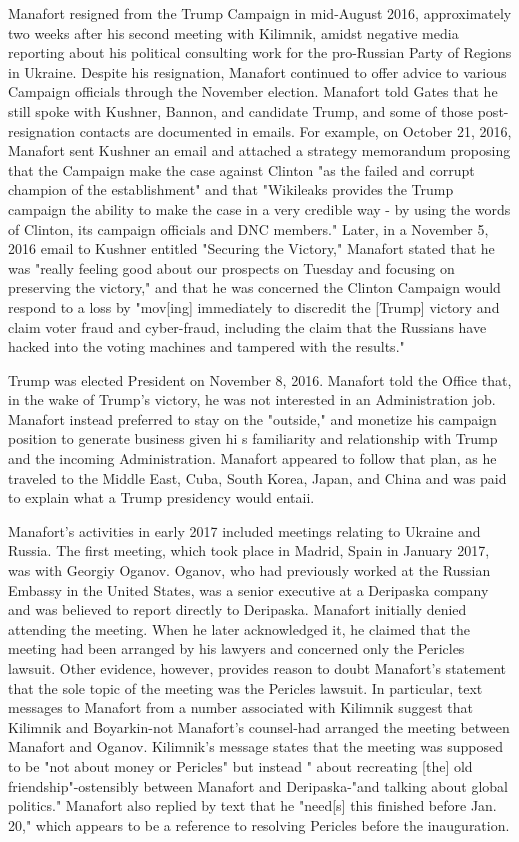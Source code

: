 Manafort resigned from the Trump Campaign in mid-August 2016, approximately two weeks after his second meeting with Kilimnik, amidst negative media reporting about his political consulting work for the pro-Russian Party of Regions in Ukraine. Despite his resignation, Manafort continued to offer advice to various Campaign officials through the November election. Manafort told Gates that he still spoke with Kushner, Bannon, and candidate Trump,%
and some of those post-resignation contacts are documented in emails. For example, on October 21, 2016, Manafort sent Kushner an email and attached a strategy memorandum proposing that the Campaign make the case against Clinton "as the failed and corrupt champion of the establishment" and that "Wikileaks provides the Trump campaign the ability to make the case in a very credible way - by using the words of Clinton, its campaign officials and DNC members."%
Later, in a November 5, 2016 email to Kushner entitled "Securing the Victory," Manafort stated that he was "really feeling good about our prospects on Tuesday and focusing on preserving the victory," and that he was concerned the Clinton Campaign would respond to a loss by "mov[ing] immediately to discredit the [Trump] victory and claim voter fraud and cyber-fraud, including the claim that the Russians have hacked into the voting machines and tampered with the results."%

Trump was elected President on November 8, 2016. Manafort told the Office that, in the wake of Trump's victory, he was not interested in an Administration job. Manafort instead preferred to stay on the "outside," and monetize his campaign position to generate business given hi s familiarity and relationship with Trump and the incoming Administration.%
Manafort appeared to follow that plan, as he traveled to the Middle East, Cuba, South Korea, Japan, and China and was paid to explain what a Trump presidency would entaii.%

Manafort's activities in early 2017 included meetings relating to Ukraine and Russia. The first meeting, which took place in Madrid, Spain in January 2017, was with Georgiy Oganov. Oganov, who had previously worked at the Russian Embassy in the United States, was a senior executive at a Deripaska company and was believed to report directly to Deripaska.%
Manafort initially denied attending the meeting. When he later acknowledged it, he claimed that the meeting had been arranged by his lawyers and concerned only the Pericles lawsuit.%
Other evidence, however, provides reason to doubt Manafort's statement that the sole topic of the meeting was the Pericles lawsuit. In particular, text messages to Manafort from a number associated with Kilimnik suggest that Kilimnik and Boyarkin-not Manafort's counsel-had arranged the meeting between Manafort and Oganov.%
Kilimnik's message states that the meeting was supposed to be "not about money or Pericles" but instead " about recreating [the] old friendship"-ostensibly between Manafort and Deripaska-"and talking about global politics."%
Manafort also replied by text that he "need[s] this finished before Jan. 20,"%
which appears to be a reference to resolving Pericles before the inauguration.

